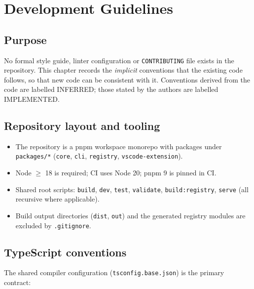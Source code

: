 \chapter{Development Guidelines}
\label{ch:development-guidelines}

\section{Purpose}

No formal style guide, linter configuration or \texttt{CONTRIBUTING} file exists
in the repository. This chapter records the \emph{implicit} conventions that the
existing code follows, so that new code can be consistent with it. Conventions
derived from the code are labelled INFERRED; those stated by the authors are
labelled IMPLEMENTED.

\section{Repository layout and tooling}

\begin{itemize}
  \item The repository is a pnpm workspace monorepo with packages under
        \texttt{packages/*} (\texttt{core}, \texttt{cli}, \texttt{registry},
        \texttt{vscode-extension}).
  \item Node $\geq$ 18 is required; CI uses Node 20; pnpm 9 is pinned in CI.
  \item Shared root scripts: \texttt{build}, \texttt{dev}, \texttt{test},
        \texttt{validate}, \texttt{build:registry}, \texttt{serve}
        (all recursive where applicable).
  \item Build output directories (\texttt{dist}, \texttt{out}) and the generated
        registry modules are excluded by \texttt{.gitignore}.
\end{itemize}

\section{TypeScript conventions}

The shared compiler configuration (\texttt{tsconfig.base.json}) is the primary
contract:

